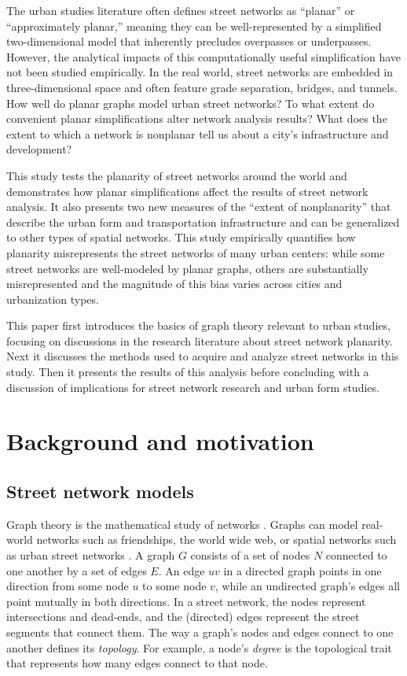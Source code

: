 \documentclass[Afour,sageh,times]{sagej}
\begin{document}
The urban studies literature often defines street networks as \enquote{planar} or \enquote{approximately planar,} meaning they can be well-represented by a simplified two-dimensional model that inherently precludes overpasses or underpasses. However, the analytical impacts of this computationally useful simplification have not been studied empirically. In the real world, street networks are embedded in three-dimensional space and often feature grade separation, bridges, and tunnels. How well do planar graphs model urban street networks? To what extent do convenient planar simplifications alter network analysis results? What does the extent to which a network is nonplanar tell us about a city's infrastructure and development?

This study tests the planarity of street networks around the world and demonstrates how planar simplifications affect the results of street network analysis. It also presents two new measures of the \enquote{extent of nonplanarity} that describe the urban form and transportation infrastructure and can be generalized to other types of spatial networks. This study empirically quantifies how planarity misrepresents the street networks of many urban centers: while some street networks are well-modeled by planar graphs, others are substantially misrepresented and the magnitude of this bias varies across cities and urbanization types.

This paper first introduces the basics of graph theory relevant to urban studies, focusing on discussions in the research literature about street network planarity. Next it discusses the methods used to acquire and analyze street networks in this study. Then it presents the results of this analysis before concluding with a discussion of implications for street network research and urban form studies.



\section{Background and motivation}

\subsection{Street network models}

Graph theory is the mathematical study of networks \citep{newman_networks:_2010}. Graphs can model real-world networks such as friendships, the world wide web, or spatial networks such as urban street networks \citep{barthelemy_spatial_2011}. A graph $G$ consists of a set of nodes $N$ connected to one another by a set of edges $E$. An edge $uv$ in a directed graph points in one direction from some node $u$ to some node $v$, while an undirected graph's edges all point mutually in both directions. In a street network, the nodes represent intersections and dead-ends, and the (directed) edges represent the street segments that connect them. The way a graph's nodes and edges connect to one another defines its \emph{topology}. For example, a node's \emph{degree} is the topological trait that represents how many edges connect to that node.
\end{document}
